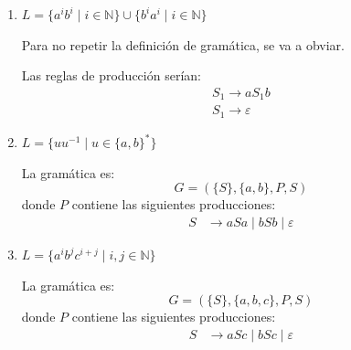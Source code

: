 \documentclass[12pt]{book} %
\begin{document}
\begin{ejercicioresuelto}
\begin{enumerate}
    \item \( L = \{a^i b^i \mid i \in \mathbb{N}\} \cup \{b^i a^i \mid i \in \mathbb{N}\} \)

    \begin{solucion}
    Para no repetir la definición de gramática, se va a obviar.

    Las reglas de producción serían:
    \begin{align*}
    S_1 \rightarrow aS_1b \\
    S_1 \rightarrow \varepsilon
    \end{align*}

    \end{solucion}

    \item \( L = \{uu^{-1} \mid u \in \{a, b\}^*\} \)

    \begin{solucion}
    La gramática es:
    \[
    G = (\{S\}, \{a, b\}, P, S)
    \]
    donde \( P \) contiene las siguientes producciones:
    \[
    \begin{aligned}
        S &\to aSa \mid bSb \mid \varepsilon
    \end{aligned}
    \]
    \end{solucion}

    \item \( L = \{a^i b^j c^{i+j} \mid i, j \in \mathbb{N}\} \)

    \begin{solucion}
    La gramática es:
    \[
    G = (\{S\}, \{a, b, c\}, P, S)
    \]
    donde \( P \) contiene las siguientes producciones:
    \[
    \begin{aligned}
        S &\to aSc \mid bSc \mid \varepsilon
    \end{aligned}
    \]
    \end{solucion}
\end{enumerate}
\end{ejercicioresuelto}
\end{document}
